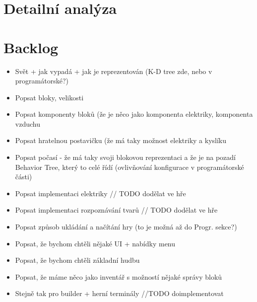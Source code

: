 
\chapter{Detailní analýza}






















\chapter{Backlog}

\begin{itemize}
	\item Svět + jak vypadá + jak je reprezentován (K-D tree zde, nebo v programátorské?)
	\item Popsat bloky, velikosti
	\item Popsat komponenty bloků (že je něco jako komponenta elektriky, komponenta vzduchu
	\item Popsat hratelnou postavičku (že má taky možnost elektriky a kyslíku
	\item Popsat počasí - že má taky svoji blokovou reprezentaci a že je na pozadí Behavior Tree, který to celé řídí (ovlivňování konfigurace v programátorské části)
	\item Popsat implementaci elektriky // TODO dodělat ve hře
	\item Popsat implementaci rozpoznávání tvarů // TODO dodělat ve hře
	\item Popsat způsob ukládání a načítání hry (to je možná až do Progr. sekce?)
	\item Popsat, že bychom chtěli nějaké UI + nabídky menu
	\item Popsat, že bychom chtěli základní hudbu
	\item Popsat, že máme něco jako inventář s možností nějaké správy bloků
	\item Stejně tak pro builder + herní terminály  //TODO doimplementovat
\end{itemize}
